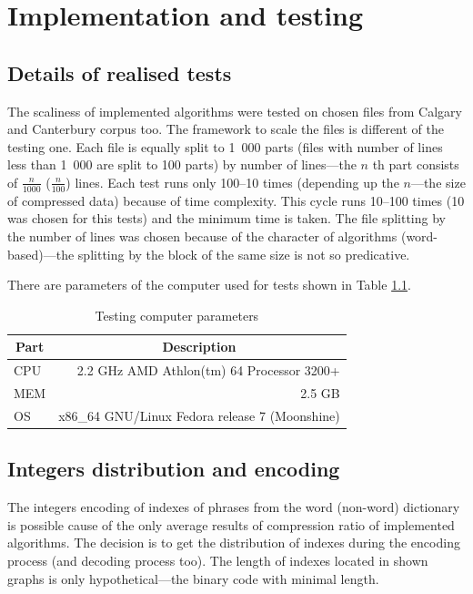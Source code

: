 \documentclass[thesis=M,english]{FITthesis}[2012/10/20]
\begin{document}
\chapter{Implementation and testing}\label{impltest}

\section{Details of realised tests}

The scaliness of implemented algorithms were tested on chosen files from Calgary and Canterbury corpus too. The framework to scale the files is different of the testing one. Each file is equally split to 1~000 parts (files with number of lines less than 1~000 are split to 100 parts) by number of lines---the $n$ th part consists of $\frac{n}{1000}$ ($\frac{n}{100}$) lines. Each test runs only 100--10 times (depending up the $n$---the size of compressed data) because of time complexity. This cycle runs 10--100 times (10 was chosen for this tests) and the minimum time is taken. The file splitting by the number of lines was chosen because of the character of algorithms (word-based)---the splitting by the block of the same size is not so predicative.

There are parameters of the computer used for tests shown in Table \ref{tab:PCparam}.
\begin{table}\centering
	\caption{Testing computer parameters}
	\label{tab:PCparam}
	\begin{tabular}{|l|r|}
	\hline \multicolumn{1}{|c|}{\textbf{Part}} & \multicolumn{1}{|c|}{\textbf{Description}} \\\hline
	CPU & 2.2 GHz AMD Athlon(tm) 64 Processor 3200+\\
	MEM & 2.5 GB\\
	OS & x86\_64 GNU/Linux Fedora release 7 (Moonshine)\\\hline
	\end{tabular}
\end{table}

\section{Integers distribution and encoding}\label{sec:distr}

The integers encoding of indexes of phrases from the word (non-word) dictionary is possible cause of the only average results of compression ratio of implemented algorithms. The decision is to get the distribution of indexes during the encoding process (and decoding process too). The length of indexes located in shown graphs is only hypothetical---the binary code with minimal length.
\end{document}
